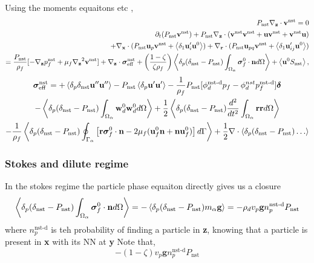Using the moments equaitons etc ,
\begin{align}
    P_\text{nst} {\mathbf{\nabla}_\textbf{z}} \cdot  \textbf{v}^\text{nst} = 0 \\
    \partial_t (P_\text{nst} \textbf{v}^\text{nst})
    + P_\text{nst} {\mathbf{\nabla}_\textbf{z}} \cdot  (
     \textbf{v}^\text{nst} \textbf{v}^\text{nst}  
    + \textbf{u} \textbf{v}^\text{nst} 
    + \textbf{v}^\text{nst} \textbf{u} 
    )\nonumber\\
    + {\mathbf{\nabla}_\textbf{x}}\cdot(P_\text{nst} \textbf{u}_p \textbf{v}^\text{nst} + \left<\delta_1 \textbf{u}_{i}' \textbf{u}^0\right> )
    + {\mathbf{\nabla}_\textbf{r}}\cdot(P_\text{nst} \textbf{u}_{pq} \textbf{v}^\text{nst} + \left<\delta_1 \textbf{u}_{ij}' \textbf{u}^0\right> )\\
    = \frac{P_\text{nst}}{\rho_f}[
        - {\mathbf{\nabla}_\textbf{z}} p_f^\text{nst}
        + \mu_f {\mathbf{\nabla}_\textbf{z}}^2 \textbf{v}^\text{nst}
    ]
    +{\mathbf{\nabla}_\textbf{z}}\cdot \bm\sigma_\text{eff}^\text{nst}
    + \left(\frac{1-\zeta}{\zeta\rho_f}\right) \left<\delta_p  (\delta_\text{nst} - P_\text{nst}) \int_{\Omega_{\alpha}} \bm\sigma_f^0\cdot \textbf{n} d\Omega\right>
    + \left<\textbf{u}^0 S_\text{nst}\right>,
\end{align}
\begin{multline*}
    \bm\sigma^\text{nst}_\text{eff}
    = + \left<\delta_p \delta_\text{nst} \textbf{u}''\textbf{u}''\right>
    - P_\text{nst} \left<\delta_p  \textbf{u}'\textbf{u}'\right>
    - \frac{1}{\rho_f }P_\text{nst} [\phi_d^\text{nst-d} p_f
    - \phi_d^{nst} p_f^\text{nst-d}]\bm\delta \\
    -  \left<\delta_p (\delta_\text{nst} - P_\text{nst}) \int_{\Omega_{\alpha}} \textbf{w}_d^0\textbf{w}_d^0  d\Omega\right>
    +  \frac{1}{2}\left<\delta_p (\delta_\text{nst} - P_\text{nst})\frac{d^2}{dt^2} \int_{\Omega_{\alpha}} \textbf{rr} d\Omega \right> \\
    - \frac{1}{\rho_f}\left<\delta_p (\delta_\text{nst} - P_\text{nst}) \oint_{\Gamma_{\alpha}} \left[
        \textbf{r}\bm{\sigma}_f^0 \cdot \textbf{n}
        -  2 \mu_f (\textbf{u}_f^0 \textbf{n} + \textbf{n} \textbf{u}_f^0)
        \right] 
     d\Gamma\right>
    + \frac{1}{2}\mathbf{\nabla}\cdot\left<\delta_p (\delta_\text{nst} - P_\text{nst} )\ldots\right>
\end{multline*}



\subsubsection*{Stokes and dilute regime}

In the stokes regime the particle phase equaiton directly gives us a closure 
\begin{equation}
    \left<\delta_p  (\delta_\text{nst} - P_\text{nst}) \int_{\Omega_{\alpha}} \bm\sigma_f^0\cdot \textbf{n} d\Omega\right>
    = 
    -  \left<\delta_p  (\delta_\text{nst} - P_\text{nst}) m_\alpha \textbf{g}\right>
    = 
    - \rho_d v_p \textbf{g} n_p^\text{nst-d} P_\text{nst}
\end{equation}
where $n_p^\text{nst-d}$ is teh probability of finding a particle in \textbf{z}, knowing that a particle is present in \textbf{x} with its NN at \textbf{y}
Note that, 
\begin{equation}
    - \left(1-\zeta\right)  v_p \textbf{g} n_p^\text{nst-d} P_\text{nst}
\end{equation}

